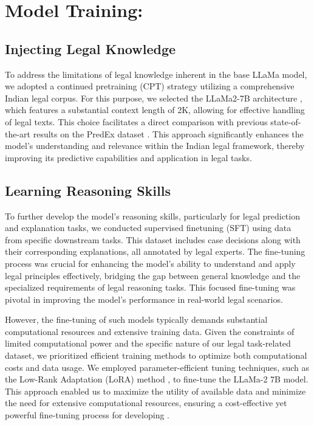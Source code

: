 \section{Model Training: \namel}

\subsection{Injecting Legal Knowledge}

To address the limitations of legal knowledge inherent in the base LLaMa model, we adopted a continued pretraining (CPT) strategy utilizing a comprehensive Indian legal corpus. For this purpose, we selected the LLaMa2-7B architecture \cite{touvron2023llama}, which features a substantial context length of 2K, allowing for effective handling of legal texts. This choice facilitates a direct comparison with previous state-of-the-art results on the PredEx dataset \cite{nigam2024legaljudgmentreimaginedpredex}. This approach significantly enhances the model's understanding and relevance within the Indian legal framework, thereby improving its predictive capabilities and application in legal tasks.

\subsection{Learning Reasoning Skills}

To further develop the model's reasoning skills, particularly for legal prediction and explanation tasks, we conducted supervised finetuning (SFT) using data from specific downstream tasks. This dataset includes case decisions along with their corresponding explanations, all annotated by legal experts. The fine-tuning process was crucial for enhancing the model's ability to understand and apply legal principles effectively, bridging the gap between general knowledge and the specialized requirements of legal reasoning tasks. This focused fine-tuning was pivotal in improving the model's performance in real-world legal scenarios.

However, the fine-tuning of such models typically demands substantial computational resources and extensive training data. Given the constraints of limited computational power and the specific nature of our legal task-related dataset, we prioritized efficient training methods to optimize both computational costs and data usage. We employed parameter-efficient tuning techniques, such as the Low-Rank Adaptation (LoRA) method \cite{hu2021lora}, to fine-tune the LLaMa-2 7B model. This approach enabled us to maximize the utility of available data and minimize the need for extensive computational resources, ensuring a cost-effective yet powerful fine-tuning process for developing \texttt{\namel}.

